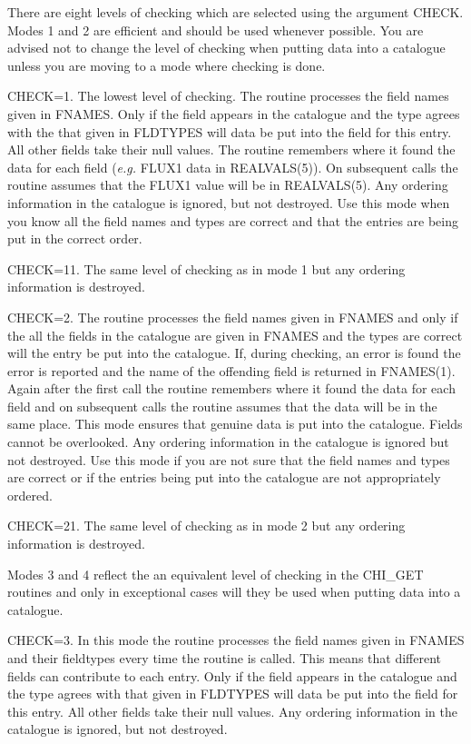 \begin{small}
{{      There are eight levels of checking which are selected using the argument
      CHECK. Modes 1 and 2 are efficient and should be used whenever possible.
      You are advised not to change the level of checking when putting data
      into a catalogue unless you are moving to a mode where checking is done.

      CHECK=1. The lowest level of checking. The routine processes the field
      names given in FNAMES. Only if the field appears in the catalogue and
      the type agrees with the that given in FLDTYPES will data be put into
      the field for this entry. All other fields take their null values. The
      routine remembers where it found the data for each field ({\em e.g.} FLUX1 data
      in REALVALS(5)). On subsequent calls the routine assumes that the FLUX1
      value will be in REALVALS(5). Any ordering information in the catalogue
      is ignored, but not destroyed. Use this mode when you know all the field
      names and types are correct and that the entries are being put in the
      correct order.

      CHECK=11. The same level of checking as in mode 1 but any ordering
      information is destroyed.

      CHECK=2. The routine processes the field names given in FNAMES and only
      if the all the fields in the catalogue are given in FNAMES and the
      types are correct will the entry be put into the catalogue. If, during
      checking, an error is found the error is reported and the name of the
      offending field is returned in FNAMES(1). Again after
      the first call the routine remembers where it found the data for each
      field and on subsequent calls the routine assumes that the data will be
      in the same place. This mode ensures that genuine data is put into the
      catalogue. Fields cannot be overlooked. Any ordering information in the
      catalogue is ignored but not destroyed. Use this mode if you are not
      sure that the field
      names and types are correct or if the entries being put into the
      catalogue are not appropriately ordered.

      CHECK=21. The same level of checking as in mode 2 but any ordering
      information is destroyed.

      Modes 3 and 4 reflect the an equivalent level of checking in the
      CHI\_GET routines and only in exceptional cases will they be used
      when putting data into a catalogue.

      CHECK=3. In this mode the routine processes the field names given in
      FNAMES and their fieldtypes every time the routine is called. This means
      that different fields can contribute to each entry. Only if the field
      appears in the catalogue and
      the type agrees with that given in FLDTYPES will data be put into
      the field for this entry. All other fields take their null values.
      Any ordering information in the catalogue
      is ignored, but not destroyed.

}}
\end{small}
